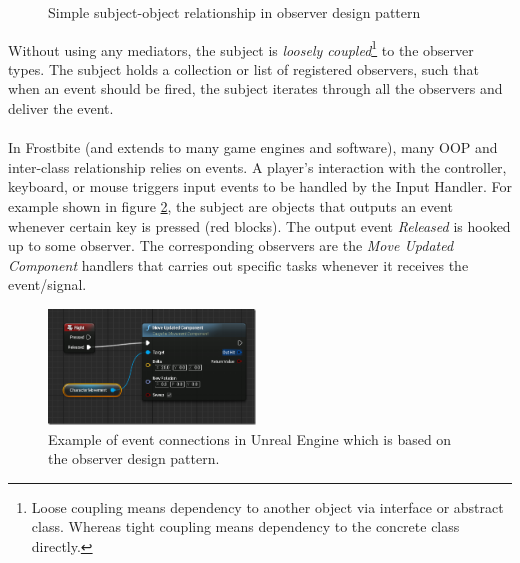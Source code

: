 \begin{multicols}{2}
\begin{figure}[H]
	\caption{Simple subject-object relationship in observer design pattern}
	\label{fig:observer-simple}
\end{figure}

Without using any mediators, the subject is \textit{loosely coupled}\footnote{Loose coupling means dependency to another object via interface or abstract class. Whereas tight coupling means dependency to the concrete class directly.} to the observer types. The subject holds a collection or list of registered observers, such that when an event should be fired, the subject iterates through all the observers and deliver the event.\bs
\\
\\
In Frostbite (and extends to many game engines and software), many OOP and inter-class relationship relies on events. A player's interaction with the controller, keyboard, or mouse triggers input events to be handled by the Input Handler. For example shown in figure \ref{fig:unreal-input}, the subject are objects that outputs an event whenever certain key is pressed (red blocks). The output event \textit{Released} is hooked up to some observer. The corresponding observers are the \textit{Move Updated Component} handlers that carries out specific tasks whenever it receives the event/signal.

\begin{figure}[H]
	\centering
	\includegraphics[width=0.49\textwidth]{assets/unreal-input}
	\caption{Example of event connections in Unreal Engine which is based on the observer design pattern. \cite{gfs-input}}
	\label{fig:unreal-input}
\end{figure}


\end{multicols}
